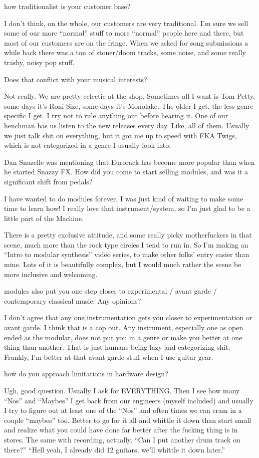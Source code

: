 how traditionalist is your customer base? 

I don't think, on the whole, our customers are very traditional. I'm sure we 
sell some of our more “normal” stuff to more “normal” people here and there, but 
most of our customers are on the fringe. When we asked for song submissions a
while back there was a ton of stoner/doom tracks, some noise, and some really 
trashy, noisy pop stuff.  

Does that conflict with your musical interests? 

Not really. We are pretty eclectic at the shop. Sometimes all I want is Tom 
Petty, some days it’s Roni Size, some days it's Monolake. The older I get, the 
less genre specific I get. I try not to rule anything out before hearing it. One of our 
henchman has us listen to the new releases every day. Like, all of them. Usually 
we just talk shit on everything, but it got me up to speed with FKA Twigs, which is 
not categorized in a genre I usually look into. 

Dan Snazelle was mentioning that Eurorack has become more popular than
when he started Snazzy FX. How did you come to start selling modules,
and was it a significant shift from pedals? 

I have wanted to do modules forever, I was just kind of waiting to make 
some time to learn how! I really love that instrument/system, so I'm just glad to be 
a little part of the Machine. 

There is a pretty exclusive attitude, and some really picky motherfuckers in 
that scene, much more than the rock type circles I tend to run in. So I'm making 
an “Intro to modular synthesis” video series, to make other folks' entry easier 
than mine.  Lots of it is beautifully complex, but I would much rather the scene be 
more inclusive and welcoming.

modules also put you one step closer to experimental / avant garde /
contemporary classical music. Any opinions? 

I don’t agree that any one instrumentation gets you closer to 
experimentation or avant garde.  I think that is a cop out.  Any instrument, 
especially one as open ended as the modular, does not put you in a genre or 
make you better at one thing than another. That is just humans being lazy and 
categorizing shit. Frankly, I'm better at that avant garde stuff when I use guitar 
gear.

how do you approach limitations in hardware design? 

Ugh, good question. Usually I ask for EVERYTHING. Then I see how many 
“Nos” and “Maybes” I get back from our engineers (myself included) and usually I
try to figure out at least one of the “Nos” and often times we can cram in a couple 
“maybes” too. Better to go for it all and whittle it down than start small and realize 
what you could have done far better after the fucking thing is in stores. The same 
with recording, actually. “Can I put another drum track on there?” “Hell yeah, I 
already did 12 guitars, we'll whittle it down later.”

